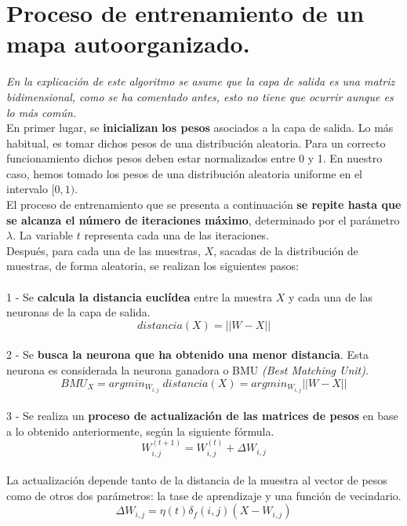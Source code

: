 \section{Proceso de entrenamiento de un mapa autoorganizado.}
\textit{En la explicación de este algoritmo se asume que la capa de salida es una matriz bidimensional, como se ha comentado antes, esto no tiene que ocurrir aunque es lo más común.}\\

En primer lugar, se \textbf{inicializan} \textbf{los pesos} asociados a la capa de salida. Lo más habitual, es tomar dichos pesos de una distribución aleatoria.
Para un correcto funcionamiento dichos pesos deben estar normalizados entre 0 y 1. En nuestro caso, hemos tomado los pesos de una distribución aleatoria uniforme en el intervalo $[0, 1)$.\\

El proceso de entrenamiento que se presenta a continuación \textbf{se repite hasta que se alcanza el número de iteraciones máximo}, determinado por el parámetro $\lambda$. La variable $t$ representa cada una de las iteraciones.\\

Después, para cada una de las muestras, $X$, sacadas de la distribución de muestras, de forma aleatoria, se realizan los siguientes pasos: \\\\
1 - Se \textbf{calcula la distancia euclídea} entre la muestra $X$ y cada una de las neuronas de la capa de salida.\\
$$distancia(X) = || W - X ||$$\\
2 - Se \textbf{busca la neurona que ha obtenido una menor distancia}. Esta neurona es considerada la neurona ganadora o BMU \textit{(Best Matching Unit)}.\\
$$BMU_X = argmin_{W_{i, j}} \; distancia(X) = argmin_{W_{i, j}} || W - X ||$$\\
3 - Se realiza un \textbf{proceso de actualización de las matrices de pesos} en base a lo obtenido anteriormente, según la siguiente fórmula.\\
$$ W_{i, j}^{(t+1)} = W_{i, j}^{(t)} + \Delta {W_{i,j}} $$\\

La actualización depende tanto de la distancia de la muestra al vector de pesos como de otros dos parámetros: la tase de aprendizaje y una función de vecindario.\\

$$\Delta W_{i,j} = \eta(t)\delta_f(i,j)(X-W_{i,j})$$\\

